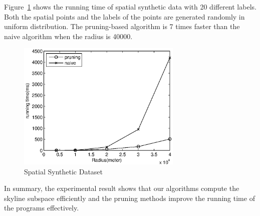 Figure~\ref{fig:exp:spatial} shows the running time of spatial synthetic data with 20 different labels. Both the spatial points and the labels of the points are generated randomly in uniform distribution. The pruning-based algorithm is 7 times faster than the naive algorithm when the radius is 40000.

\begin{figure}[h]
    \centering
        \includegraphics[width=0.7\textwidth]{figs/Spatial}
    \caption{Spatial Synthetic Dataset}
    \label{fig:exp:spatial}
\end{figure}

In summary, the experimental result shows that our algorithms compute the skyline subspace efficiently and the pruning methods improve the running time of the programs effectively.